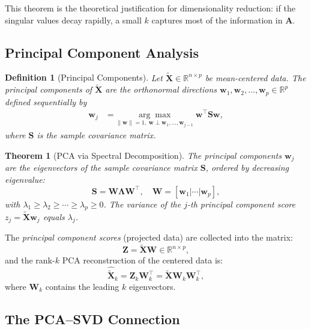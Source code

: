 \documentclass[conference]{IEEEtran}
\newtheorem{theorem}{Theorem}
\newtheorem{definition}{Definition}
\begin{document}
This theorem is the theoretical justification for dimensionality reduction: if the singular values decay rapidly, a small $k$ captures most of the information in $\mathbf{A}$.

\subsection{Principal Component Analysis}

\begin{definition}[Principal Components]
Let $\tilde{\mathbf{X}} \in \mathbb{R}^{n \times p}$ be mean-centered data. The \emph{principal components} of $\tilde{\mathbf{X}}$ are the orthonormal directions $\mathbf{w}_1, \mathbf{w}_2, \ldots, \mathbf{w}_p \in \mathbb{R}^p$ defined sequentially by
\begin{align}
\mathbf{w}_j &= \underset{\|\mathbf{w}\|=1,\; \mathbf{w} \perp \mathbf{w}_1,\ldots,\mathbf{w}_{j-1}}{\arg\max}\; \mathbf{w}^\top \mathbf{S} \mathbf{w},
\end{align}
where $\mathbf{S}$ is the sample covariance matrix.
\end{definition}

\begin{theorem}[PCA via Spectral Decomposition]
The principal components $\mathbf{w}_j$ are the eigenvectors of the sample covariance matrix $\mathbf{S}$, ordered by decreasing eigenvalue:
\begin{equation}
\mathbf{S} = \mathbf{W}\mathbf{\Lambda}\mathbf{W}^\top, \quad \mathbf{W} = [\mathbf{w}_1 | \cdots | \mathbf{w}_p],
\end{equation}
with $\lambda_1 \geq \lambda_2 \geq \cdots \geq \lambda_p \geq 0$. The variance of the $j$-th principal component score $z_j = \tilde{\mathbf{X}}\mathbf{w}_j$ equals $\lambda_j$.
\end{theorem}

The \emph{principal component scores} (projected data) are collected into the matrix:
\begin{equation}
\mathbf{Z} = \tilde{\mathbf{X}}\mathbf{W} \in \mathbb{R}^{n \times p},
\end{equation}
and the rank-$k$ PCA reconstruction of the centered data is:
\begin{equation}
\hat{\tilde{\mathbf{X}}}_k = \mathbf{Z}_k \mathbf{W}_k^\top = \tilde{\mathbf{X}}\mathbf{W}_k\mathbf{W}_k^\top,
\end{equation}
where $\mathbf{W}_k$ contains the leading $k$ eigenvectors.

\subsection{The PCA--SVD Connection}
\end{document}
